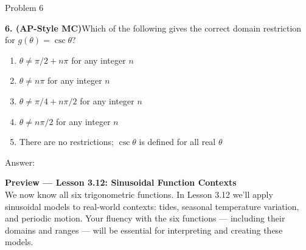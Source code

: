 \documentclass[10pt]{article}
\begin{document}
\vspace{0.08in}

\begin{notesbox}{Problem 6}

\textbf{6. (AP-Style MC)}\quad Which of the following gives the correct domain
restriction for $g(\theta) = \csc\theta$?

\begin{enumerate}[label=(\Alph*), leftmargin=2em, itemsep=3pt]
  \item $\theta \neq \pi/2 + n\pi$ for any integer $n$
  \item $\theta \neq n\pi$ for any integer $n$
  \item $\theta \neq \pi/4 + n\pi/2$ for any integer $n$
  \item $\theta \neq n\pi/2$ for any integer $n$
  \item There are no restrictions; $\csc\theta$ is defined for all real $\theta$
\end{enumerate}

Answer: \underline{\hspace{1.5cm}}

\end{notesbox}

\vspace{0.08in}

\begin{tcolorbox}[colback=navylight, colframe=navy, arc=2mm,
    left=3mm, right=3mm, top=2mm, bottom=2mm]
\small\textbf{Preview --- Lesson 3.12: Sinusoidal Function Contexts}\\
We now know all six trigonometric functions. In Lesson 3.12 we'll apply
sinusoidal models to real-world contexts: tides, seasonal temperature variation,
and periodic motion. Your fluency with the six functions --- including their
domains and ranges --- will be essential for interpreting and creating
these models.
\end{tcolorbox}
\end{document}
